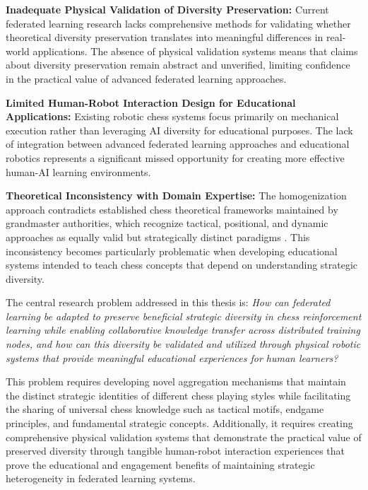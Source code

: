 \textbf{Inadequate Physical Validation of Diversity Preservation:} Current federated learning research lacks comprehensive methods for validating whether theoretical diversity preservation translates into meaningful differences in real-world applications. The absence of physical validation systems means that claims about diversity preservation remain abstract and unverified, limiting confidence in the practical value of advanced federated learning approaches.

\textbf{Limited Human-Robot Interaction Design for Educational Applications:} Existing robotic chess systems focus primarily on mechanical execution rather than leveraging AI diversity for educational purposes. The lack of integration between advanced federated learning approaches and educational robotics represents a significant missed opportunity for creating more effective human-AI learning environments.

\textbf{Theoretical Inconsistency with Domain Expertise:} The homogenization approach contradicts established chess theoretical frameworks maintained by grandmaster authorities, which recognize tactical, positional, and dynamic approaches as equally valid but strategically distinct paradigms \cite{matanovic1974encyclopedia,chess_opening_styles}. This inconsistency becomes particularly problematic when developing educational systems intended to teach chess concepts that depend on understanding strategic diversity.

The central research problem addressed in this thesis is: \textit{How can federated learning be adapted to preserve beneficial strategic diversity in chess reinforcement learning while enabling collaborative knowledge transfer across distributed training nodes, and how can this diversity be validated and utilized through physical robotic systems that provide meaningful educational experiences for human learners?}

This problem requires developing novel aggregation mechanisms that maintain the distinct strategic identities of different chess playing styles while facilitating the sharing of universal chess knowledge such as tactical motifs, endgame principles, and fundamental strategic concepts. Additionally, it requires creating comprehensive physical validation systems that demonstrate the practical value of preserved diversity through tangible human-robot interaction experiences that prove the educational and engagement benefits of maintaining strategic heterogeneity in federated learning systems.

